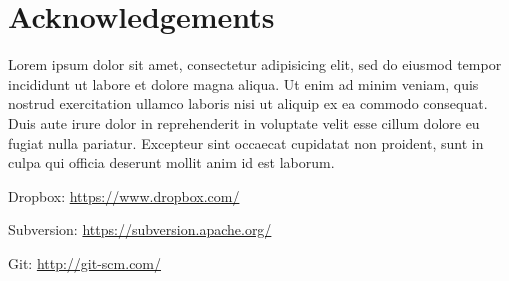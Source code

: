 \documentclass[12pt,a4paper]{article}
\begin{document}
\section{Acknowledgements}
Lorem ipsum dolor sit amet, consectetur adipisicing elit, sed do eiusmod tempor incididunt ut labore et dolore magna aliqua. Ut enim ad minim veniam, quis nostrud exercitation ullamco laboris nisi ut aliquip ex ea commodo consequat. Duis aute irure dolor in reprehenderit in voluptate velit esse cillum dolore eu fugiat nulla pariatur. Excepteur sint occaecat cupidatat non proident, sunt in culpa qui officia deserunt mollit anim id est laborum.

\begin{thebibliography}{9}

  Dropbox: \url{https://www.dropbox.com/}
  
  Subversion: \url{https://subversion.apache.org/}

  Git: \url{http://git-scm.com/}


\end{thebibliography}
\end{document}
